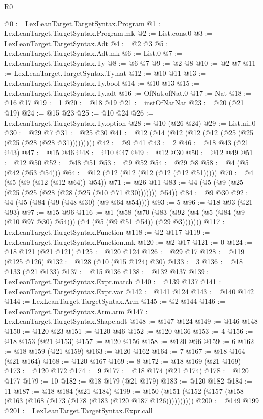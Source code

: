 \begin{lexlean}{R0}
\begin{coremodule}
@0 := LexLeanTarget.TargetSyntax.Program
@1 := LexLeanTarget.TargetSyntax.Program.mk
@2 := List.cons.{0}
@3 := LexLeanTarget.TargetSyntax.Adt
@4 := @2 @3
@5 := LexLeanTarget.TargetSyntax.Adt.mk
@6 := List.{0}
@7 := LexLeanTarget.TargetSyntax.Ty
@8 := @6 @7
@9 := @2 @8
@10 := @2 @7
@11 := LexLeanTarget.TargetSyntax.Ty.nat
@12 := @10 @11
@13 := LexLeanTarget.TargetSyntax.Ty.bool
@14 := @10 @13
@15 := LexLeanTarget.TargetSyntax.Ty.adt
@16 := OfNat.ofNat.{0}
@17 := Nat
@18 := @16 @17
@19 := 1
@20 := @18 @19
@21 := instOfNatNat
@23 := @20 (@21 @19)
@24 := @15 @23
@25 := @10 @24
@26 := LexLeanTarget.TargetSyntax.Ty.option
@28 := @10 (@26 @24)
@29 := List.nil.{0}
@30 := @29 @7
@31 := @25 @30
@41 := @12 (@14 (@12 (@12 (@12 (@25 (@25 (@25 (@28 (@28 @31)))))))))
@42 := @9 @41
@43 := 2
@46 := @18 @43 (@21 @43)
@47 := @15 @46
@48 := @10 @47
@49 := @12 @30
@50 := @12 @49
@51 := @12 @50
@52 := @48 @51
@53 := @9 @52
@54 := @29 @8
@58 := @4 (@5 (@42 (@53 @54)))
@64 := @12 (@12 (@12 (@12 (@12 (@12 @51)))))
@70 := @4 (@5 (@9 (@12 (@12 @64)) @54))
@71 := @26 @11
@83 := @4 (@5 (@9 (@25 (@25 (@25 (@28 (@28 (@25 (@10 @71 @30))))))) @54))
@84 := @9 @30
@92 := @4 (@5 (@84 (@9 (@48 @30) (@9 @64 @54))))
@93 := 5
@96 := @18 @93 (@21 @93)
@97 := @15 @96
@116 := @1
    (@58 (@70 (@83 (@92 (@4 (@5 (@84 (@9 (@10 @97 @30) @54))) (@4 (@5 (@9 @51 @54)) (@29 @3)))))))
@117 := LexLeanTarget.TargetSyntax.Function
@118 := @2 @117
@119 := LexLeanTarget.TargetSyntax.Function.mk
@120 := @2 @17
@121 := 0
@124 := @18 @121 (@21 @121)
@125 := @120 @124
@126 := @29 @17
@128 := @119 (@125 @126)
@132 := @128 (@10 (@15 @124) @30)
@133 := 3
@136 := @18 @133 (@21 @133)
@137 := @15 @136
@138 := @132 @137
@139 := LexLeanTarget.TargetSyntax.Expr.match
@140 := @139 @137
@141 := LexLeanTarget.TargetSyntax.Expr.var
@142 := @141 @124
@143 := @140 @142
@144 := LexLeanTarget.TargetSyntax.Arm
@145 := @2 @144
@146 := LexLeanTarget.TargetSyntax.Arm.arm
@147 := LexLeanTarget.TargetSyntax.Shape.adt
@148 := @147 @124
@149 := @146 @148
@150 := @120 @23
@151 := @120 @46
@152 := @120 @136
@153 := 4
@156 := @18 @153 (@21 @153)
@157 := @120 @156
@158 := @120 @96
@159 := 6
@162 := @18 @159 (@21 @159)
@163 := @120 @162
@164 := 7
@167 := @18 @164 (@21 @164)
@168 := @120 @167
@169 := 8
@172 := @18 @169 (@21 @169)
@173 := @120 @172
@174 := 9
@177 := @18 @174 (@21 @174)
@178 := @120 @177
@179 := 10
@182 := @18 @179 (@21 @179)
@183 := @120 @182
@184 := 11
@187 := @18 @184 (@21 @184)
@199 := @150 (@151 (@152 (@157 (@158 (@163 (@168 (@173 (@178 (@183 (@120 @187 @126))))))))))
@200 := @149 @199
@201 := LexLeanTarget.TargetSyntax.Expr.call

\end{coremodule}
\end{lexlean}
